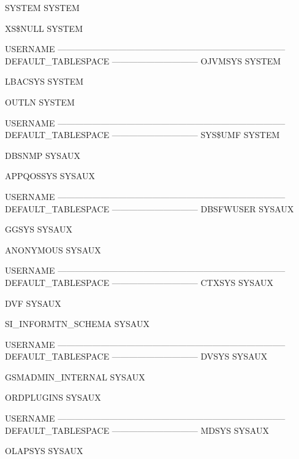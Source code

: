 \documentclass{article}
\begin{document}
\begin{enumerate}
\begin{messageshell}
SYSTEM
SYSTEM

XS\$NULL
SYSTEM
\end{messageshell}

\begin{messageshell}
USERNAME
--------------------------------------------------------------------------------
DEFAULT_TABLESPACE
------------------------------
OJVMSYS
SYSTEM

LBACSYS
SYSTEM

OUTLN
SYSTEM
\end{messageshell}

\begin{messageshell}
USERNAME
--------------------------------------------------------------------------------
DEFAULT_TABLESPACE
------------------------------
SYS\$UMF
SYSTEM

DBSNMP
SYSAUX

APPQOSSYS
SYSAUX
\end{messageshell}

\begin{messageshell}
USERNAME
--------------------------------------------------------------------------------
DEFAULT_TABLESPACE
------------------------------
DBSFWUSER
SYSAUX

GGSYS
SYSAUX

ANONYMOUS
SYSAUX
\end{messageshell}

\begin{messageshell}
USERNAME
--------------------------------------------------------------------------------
DEFAULT_TABLESPACE
------------------------------
CTXSYS
SYSAUX

DVF
SYSAUX

SI_INFORMTN_SCHEMA
SYSAUX
\end{messageshell}

\begin{messageshell}
USERNAME
--------------------------------------------------------------------------------
DEFAULT_TABLESPACE
------------------------------
DVSYS
SYSAUX

GSMADMIN_INTERNAL
SYSAUX

ORDPLUGINS
SYSAUX
\end{messageshell}

\begin{messageshell}
USERNAME
--------------------------------------------------------------------------------
DEFAULT_TABLESPACE
------------------------------
MDSYS
SYSAUX

OLAPSYS
SYSAUX


\end{messageshell}
\end{enumerate}
\end{document}

